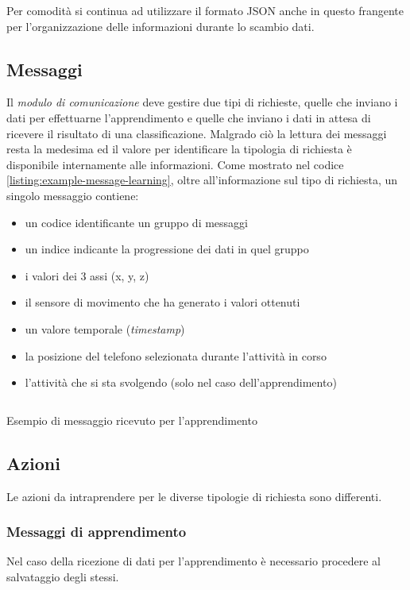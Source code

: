 Per comodità si continua ad utilizzare il formato JSON anche in questo frangente per l'organizzazione delle informazioni durante lo scambio dati.


\subsection{Messaggi}
Il \textit{modulo di comunicazione} deve gestire due tipi di richieste, quelle che inviano i dati per effettuarne l'apprendimento e quelle che inviano
i dati in attesa di ricevere il risultato di una classificazione. Malgrado ciò la lettura dei messaggi resta la medesima ed il 
valore per identificare la tipologia di richiesta è disponibile internamente alle informazioni.
\vspace{5mm} %
\newline
Come mostrato nel codice \ref{listing:example-message-learning}, oltre all'informazione sul tipo di richiesta, un singolo messaggio contiene: 
\begin{itemize}
    \item un codice identificante un gruppo di messaggi
    \item un indice indicante la progressione dei dati in quel gruppo
    \item i valori dei 3 assi (x, y, z)
    \item il sensore di movimento che ha generato i valori ottenuti
    \item un valore temporale (\textit{timestamp})
    \item la posizione del telefono selezionata durante l'attività in corso
    \item l'attività che si sta svolgendo (solo nel caso dell'apprendimento)
\end{itemize}
\vfill
\begin{listing}[H] 
    \inputminted[frame=single,framesep=10pt]{json}{assets/snippets/server/receiver/message.json}
    \caption{Esempio di messaggio ricevuto per l'apprendimento}
    \label{listing:example-message-learning}
\end{listing}

\newpage
\subsection{Azioni}
Le azioni da intraprendere per le diverse tipologie di richiesta sono differenti. 

\subsubsection{Messaggi di apprendimento}
Nel caso della ricezione di dati per l'apprendimento è necessario procedere al salvataggio degli stessi.

